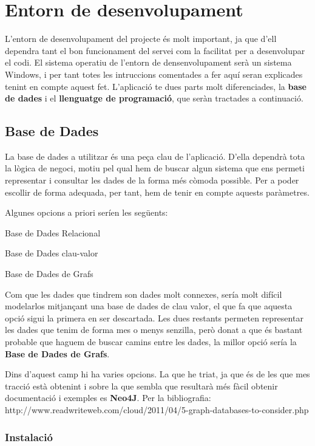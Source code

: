 \chapter{Entorn de desenvolupament}

L'entorn de desenvolupament del projecte és molt important, ja que d'ell dependra tant el bon funcionament del servei com la facilitat per a desenvolupar el codi. El sistema operatiu de l'entorn de densenvolupament serà un sistema Windows, i per tant totes les intruccions comentades a fer aquí seran explicades tenint en compte aquest fet. L'aplicació te dues parts molt diferenciades, la {\bf base de dades} i el {\bf llenguatge de programació}, que seràn tractades a continuació.

\section{Base de Dades}
La base de dades a utilitzar és una peça clau de l'aplicació. D'ella dependrà tota la lògica de negoci, motiu pel qual hem de buscar algun sistema que ens permeti representar i consultar les dades de la forma més còmoda possible. Per a poder escollir de forma adequada, per tant, hem de tenir en compte aquests paràmetres.

Algunes opcions a priori seríen les següents:

\begin{list}
\item Base de Dades Relacional
\item Base de Dades clau-valor
\item Base de Dades de Grafs
\end{list}

Com que les dades que tindrem son dades molt connexes, sería molt difícil modelarlos mitjançant una base de dades de clau valor, el que fa que aquesta opció sigui la primera en ser descartada. Les dues restants permeten representar les dades que tenim de forma mes o menys senzilla, però donat a que és bastant probable que haguem de buscar camins entre les dades, la millor opció sería la {\bf Base de Dades de Grafs}.

Dins d'aquest camp hi ha varies opcions. La que he triat, ja que és de les que mes tracció està obtenint i sobre la que sembla que resultarà més fàcil obtenir documentació i exemples es {\bf Neo4J}.
Per la bibliografia: http://www.readwriteweb.com/cloud/2011/04/5-graph-databases-to-consider.php

\subsection{Instalació}

